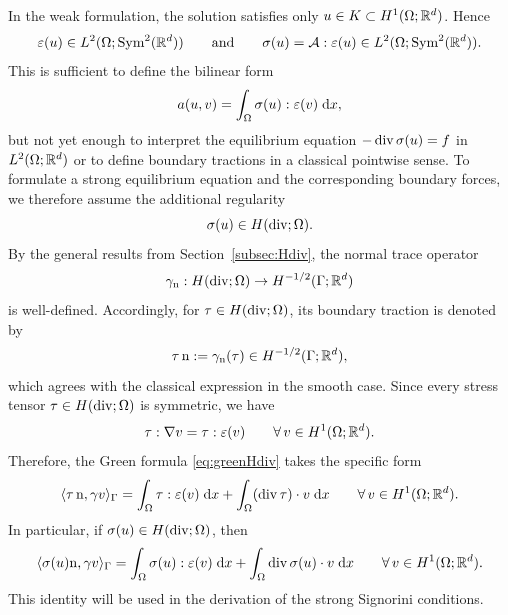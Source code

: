 In the weak formulation, the solution satisfies only $u\in K\subset H^1(\Omega;{\mathbb R}^d)$. Hence
\begin{equation*}
	\varepsilon(u)\in L^2(\Omega;\mathrm{Sym}^2({\mathbb R}^d))
	\qquad\text{and}\qquad
	\sigma(u)=\mathcal A:\varepsilon(u)\in L^2(\Omega;\mathrm{Sym}^2({\mathbb R}^d)).
\end{equation*}
This is sufficient to define the bilinear form
\begin{equation*}
	a(u,v)=\int_\Omega \sigma(u):\varepsilon(v)\;{{\mathrm{d}} x},
\end{equation*}
but not yet enough to interpret the equilibrium equation $-\diver\sigma(u)=f$ in $L^2(\Omega;{\mathbb R}^d)$ or to define boundary tractions in a classical pointwise sense. To formulate a strong equilibrium equation and the corresponding boundary forces, we therefore assume the additional regularity
\begin{equation*}
	\sigma(u)\in H(\diver;\Omega).
\end{equation*}
By the general results from Section~\ref{subsec:Hdiv}, the normal trace operator
\begin{equation*}
	\gamma_{\mathrm n}:H(\diver;\Omega)\to H^{-1/2}(\Gamma;\R^d)
\end{equation*}
is well-defined. Accordingly, for $\tau\in H(\diver;\Omega)$, its boundary traction is denoted by
\begin{equation*}
	\tau\,\mathrm n:=\gamma_{\mathrm n}(\tau)\in H^{-1/2}(\Gamma;{\mathbb R}^d),
\end{equation*}
which agrees with the classical expression in the smooth case. Since every stress tensor $\tau\in H(\diver;\Omega)$ is symmetric, we have
\begin{equation*}
	\tau:\nabla v=\tau:\varepsilon(v)
	\qquad \forall\, v\in H^1(\Omega;{\mathbb R}^d).
\end{equation*}
Therefore, the Green formula \eqref{eq:greenHdiv} takes the specific form
\begin{equation}\label{eq:green}
	\langle \tau\,\mathrm n,\gamma v\rangle_\Gamma
	=
	\int_\Omega \tau:\varepsilon(v)\;\dx
	+
	\int_\Omega (\diver\tau)\cdot v\;\dx
	\qquad
	\forall\, v\in H^1(\Omega;\R^d).
\end{equation}
In particular, if $\sigma(u)\in H(\diver;\Omega)$, then
\begin{equation}\label{eq:green_sigma}
	\langle \sigma(u)\mathrm n,\gamma v\rangle_\Gamma
	=
	\int_\Omega \sigma(u):\varepsilon(v)\;\dx
	+
	\int_\Omega \diver\sigma(u)\cdot v\;\dx
	\qquad
	\forall\, v\in H^1(\Omega;\R^d).
\end{equation}
This identity will be used in the derivation of the strong Signorini conditions.



